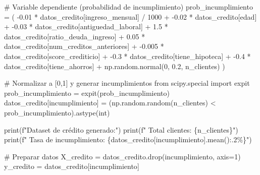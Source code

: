 \documentclass[
  doc,
  floatsintext,
  longtable,
  a4paper,
  nolmodern,
  notxfonts,
  notimes,
  12pt,
  colorlinks=true,linkcolor=blue,citecolor=blue,urlcolor=blue]{apa7}
\newenvironment{Shaded}{\begin{snugshade}}{\end{snugshade}}
\newcommand{\BuiltInTok}[1]{\textcolor[rgb]{0.00,0.23,0.31}{#1}}
\newcommand{\CommentTok}[1]{\textcolor[rgb]{0.37,0.37,0.37}{#1}}
\newcommand{\DecValTok}[1]{\textcolor[rgb]{0.68,0.00,0.00}{#1}}
\newcommand{\FloatTok}[1]{\textcolor[rgb]{0.68,0.00,0.00}{#1}}
\newcommand{\ImportTok}[1]{\textcolor[rgb]{0.00,0.46,0.62}{#1}}
\newcommand{\NormalTok}[1]{\textcolor[rgb]{0.00,0.23,0.31}{#1}}
\newcommand{\OperatorTok}[1]{\textcolor[rgb]{0.37,0.37,0.37}{#1}}
\newcommand{\SpecialCharTok}[1]{\textcolor[rgb]{0.37,0.37,0.37}{#1}}
\newcommand{\SpecialStringTok}[1]{\textcolor[rgb]{0.13,0.47,0.30}{#1}}
\newcommand{\StringTok}[1]{\textcolor[rgb]{0.13,0.47,0.30}{#1}}
\begin{document}
\begin{Shaded}
\begin{Highlighting}[]
\CommentTok{\# Variable dependiente (probabilidad de incumplimiento)}
\NormalTok{prob\_incumplimiento }\OperatorTok{=}\NormalTok{ (}
    \OperatorTok{{-}}\FloatTok{0.01} \OperatorTok{*}\NormalTok{ datos\_credito[}\StringTok{\textquotesingle{}ingreso\_mensual\textquotesingle{}}\NormalTok{] }\OperatorTok{/} \DecValTok{1000} \OperatorTok{+}
    \OperatorTok{{-}}\FloatTok{0.02} \OperatorTok{*}\NormalTok{ datos\_credito[}\StringTok{\textquotesingle{}edad\textquotesingle{}}\NormalTok{] }\OperatorTok{+}
    \OperatorTok{{-}}\FloatTok{0.03} \OperatorTok{*}\NormalTok{ datos\_credito[}\StringTok{\textquotesingle{}antiguedad\_laboral\textquotesingle{}}\NormalTok{] }\OperatorTok{+}
    \FloatTok{1.5} \OperatorTok{*}\NormalTok{ datos\_credito[}\StringTok{\textquotesingle{}ratio\_deuda\_ingreso\textquotesingle{}}\NormalTok{] }\OperatorTok{+}
    \FloatTok{0.05} \OperatorTok{*}\NormalTok{ datos\_credito[}\StringTok{\textquotesingle{}num\_creditos\_anteriores\textquotesingle{}}\NormalTok{] }\OperatorTok{+}
    \OperatorTok{{-}}\FloatTok{0.005} \OperatorTok{*}\NormalTok{ datos\_credito[}\StringTok{\textquotesingle{}score\_crediticio\textquotesingle{}}\NormalTok{] }\OperatorTok{+}
    \OperatorTok{{-}}\FloatTok{0.3} \OperatorTok{*}\NormalTok{ datos\_credito[}\StringTok{\textquotesingle{}tiene\_hipoteca\textquotesingle{}}\NormalTok{] }\OperatorTok{+}
    \OperatorTok{{-}}\FloatTok{0.4} \OperatorTok{*}\NormalTok{ datos\_credito[}\StringTok{\textquotesingle{}tiene\_ahorros\textquotesingle{}}\NormalTok{] }\OperatorTok{+}
\NormalTok{    np.random.normal(}\DecValTok{0}\NormalTok{, }\FloatTok{0.2}\NormalTok{, n\_clientes)}
\NormalTok{)}

\CommentTok{\# Normalizar a [0,1] y generar incumplimientos}
\ImportTok{from}\NormalTok{ scipy.special }\ImportTok{import}\NormalTok{ expit}
\NormalTok{prob\_incumplimiento }\OperatorTok{=}\NormalTok{ expit(prob\_incumplimiento)}
\NormalTok{datos\_credito[}\StringTok{\textquotesingle{}incumplimiento\textquotesingle{}}\NormalTok{] }\OperatorTok{=}\NormalTok{ (np.random.random(n\_clientes) }\OperatorTok{\textless{}}\NormalTok{ prob\_incumplimiento).astype(}\BuiltInTok{int}\NormalTok{)}

\BuiltInTok{print}\NormalTok{(}\SpecialStringTok{f"Dataset de crédito generado:"}\NormalTok{)}
\BuiltInTok{print}\NormalTok{(}\SpecialStringTok{f"  Total clientes: }\SpecialCharTok{\{}\NormalTok{n\_clientes}\SpecialCharTok{\}}\SpecialStringTok{"}\NormalTok{)}
\BuiltInTok{print}\NormalTok{(}\SpecialStringTok{f"  Tasa de incumplimiento: }\SpecialCharTok{\{}\NormalTok{datos\_credito[}\StringTok{\textquotesingle{}incumplimiento\textquotesingle{}}\NormalTok{]}\SpecialCharTok{.}\NormalTok{mean()}\SpecialCharTok{:.2\%\}}\SpecialStringTok{"}\NormalTok{)}

\CommentTok{\# Preparar datos}
\NormalTok{X\_credito }\OperatorTok{=}\NormalTok{ datos\_credito.drop(}\StringTok{\textquotesingle{}incumplimiento\textquotesingle{}}\NormalTok{, axis}\OperatorTok{=}\DecValTok{1}\NormalTok{)}
\NormalTok{y\_credito }\OperatorTok{=}\NormalTok{ datos\_credito[}\StringTok{\textquotesingle{}incumplimiento\textquotesingle{}}\NormalTok{]}
\end{Highlighting}
\end{Shaded}
\end{document}
